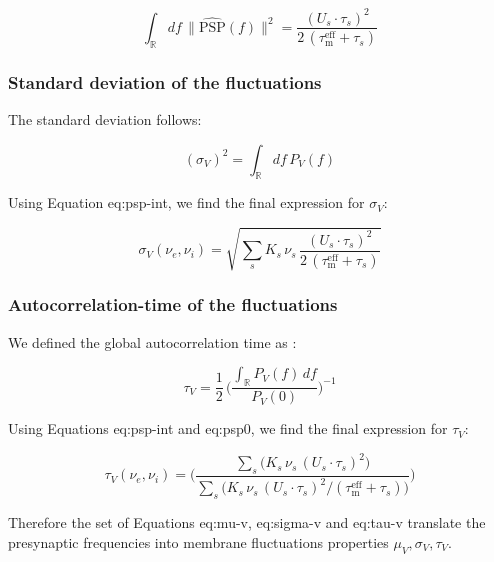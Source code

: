 \documentclass[8pt, colorlinks, a4paper]{article}
\renewcommand\ref{}
\begin{document}
\begin{equation}
\label{eq:psp-int}
\int_\mathbb{R}  df \, \| \hat{\mathrm{PSP}}(f) \|^2 = \frac{(U_s \cdot \tau_s)^2}{2 \, (\tau_\mathrm{m}^\mathrm{eff} + \tau_s ) }
\end{equation}

\subsubsection{Standard deviation of the fluctuations}
\label{sec-3-5-4}

The standard deviation follows:

\begin{equation}
 (\sigma_V)^2  = \int_\mathbb{R}  df \, P_V(f)
\end{equation}

Using Equation \ref{eq:psp-int}, we find the final expression for \(\sigma_V\):

\begin{equation}
\label{eq:sigma-v}
 \sigma_V(\nu_e, \nu_i)  = \sqrt{ \sum_s K_s \, \nu_s \, \frac{(U_s \cdot \tau_s)^2}{2 \, (\tau_\mathrm{m}^\mathrm{eff} + \tau_s ) } }
\end{equation}

\subsubsection{Autocorrelation-time of the fluctuations}
\label{sec-3-5-5}

We defined the global autocorrelation time as \cite{Zerlaut2016}:

\begin{equation}
  \tau_V = \frac{1}{2} \, \big( \frac{\int_\mathbb{R} P_V(f) \, d f}{ P_V(0) } \big)^{-1}
\end{equation}

Using Equations \ref{eq:psp-int} and \ref{eq:psp0}, we find the final expression
for \(\tau_V\):

\begin{equation}
\label{eq:tau-v}
  \tau_V(\nu_e, \nu_i) = \Big( \frac{
  \sum_s \big( K_s \, \nu_s \, (U_s \cdot \tau_s)^2\big) 
  }{
  \sum_s \big( K_s \, \nu_s \, (U_s \cdot \tau_s)^2 /(\tau_\mathrm{m}^\mathrm{eff} + \tau_s ) \big)
  } \Big)
\end{equation}

Therefore the set of Equations \ref{eq:mu-v}, \ref{eq:sigma-v} and \ref{eq:tau-v}
translate the presynaptic frequencies into membrane fluctuations
properties \(\mu_V, \sigma_V, \tau_V\).
\end{document}
